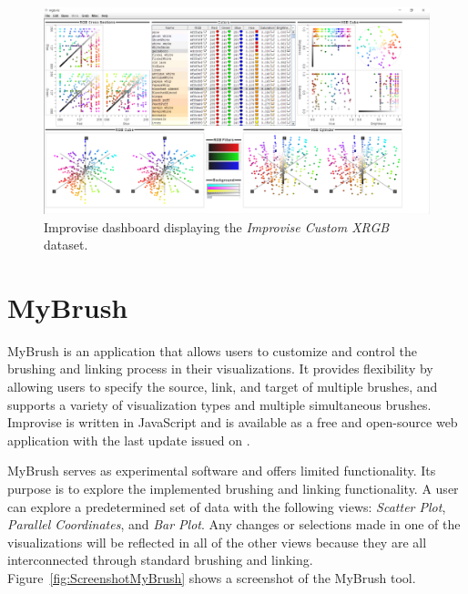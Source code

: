 \begin{figure}[tp]
\centering
\includegraphics[keepaspectratio,width=\linewidth,height=\halfh]
{images/screenshot-improvise.png}

\caption[Improvise Dashboard Screenshot]
{%
Improvise dashboard displaying the \emph{Improvise Custom XRGB} dataset.
}
\label{fig:ScreenshotImprovise}
\end{figure}




\section{MyBrush}

MyBrush \parencite{koytek2017mybrush} is an application that allows users
to customize and control the brushing and linking process in their
visualizations. It provides flexibility by allowing users to specify the
source, link, and target of multiple brushes, and supports a variety of
visualization types and multiple simultaneous brushes. Improvise is
written in JavaScript and is available as a free and open-source web
application with the last update issued on .

MyBrush serves as experimental software and offers limited functionality.
Its purpose is to explore the implemented brushing and linking
functionality.  A user can explore a predetermined set of data with the
following views: \emph{Scatter Plot}, \emph{Parallel Coordinates}, and
\emph{Bar Plot}. Any changes or selections made in one of the
visualizations will be reflected in all of the other views because they
are all interconnected through standard brushing and linking.
Figure~\ref{fig:ScreenshotMyBrush} shows a screenshot of the MyBrush tool.




